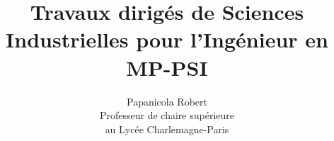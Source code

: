 \setcounter{secnumdepth}{3}
\renewcommand{\thesubsubsection}{\alph{subsubsection}~)}
\makeindex


\newdimen\oldparindent


\title{Travaux dirigés de Sciences Industrielles pour l'Ingénieur en MP-PSI}                                    %

\author{Papanicola Robert\\
Professeur de chaire supérieure \\
au  Lycée Charlemagne-Paris}                                   %
\date{}     


\usepackage{nameref}
\usepackage[francais]{varioref}
\usepackage[plainpages=false]{hyperref}

%

\ifdim\paperheight<150mm%
\let\Acinqclearpage\clearpage
\let \Aquatreclearpage\relax \else%
\let\Acinqclearpage\relax
\let\Aquatreclearpage\clearpage \fi 



\graphicspath{{../sources/5-SysLin/images/}
{../sources/1-mecanismes/images/}
{../sources/2-cinetique/images/}
{../sources/3-dynamique/images/}
{../sources/4-puissance/images/}
{../sources/5-syslin/images/}
{../sources/6-anasl/images/}
{../sources/7-corsl/images/}
{../sources/8-grafcet/images/}
{../sources/9-devoir/images/}
{../sources/A-annexes/images/}
{../sources/PCSI-Systemes/images/}
{../sources/PCSI-Syslin/images/}
{../sources/PCSI-Cinematique/images/}
{../sources/PCSI-statique/images/}
{../sources/PCSI-SED-Logique/images/}
}




\usepackage{listings}
\lstset{language=R} %

\usepackage{textcomp}
\usepackage{setspace}


